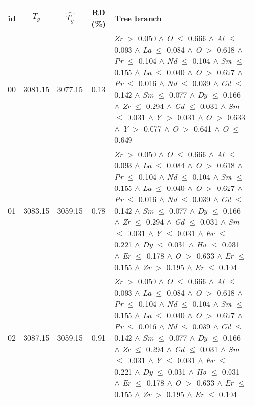 \begin{table}[!htbp]
	\setlength{\tabcolsep}{3pt}
	\begin{tabular}{ccccm{}}
		\toprule
		id & $T_g$ & $\hat{T_g}$ & RD (\%) & Tree branch\\
		\midrule
		00 & 3081.15 & 3077.15 & 0.13 & \textit{Zr} $>$ 0.050 $\wedge$ \textit{O} $\le$ 0.666 $\wedge$ \textit{Al} $\le$ 0.093 $\wedge$ \textit{La} $\le$ 0.084 $\wedge$ \textit{O} $>$ 0.618 $\wedge$ \textit{Pr} $\le$ 0.104 $\wedge$ \textit{Nd} $\le$ 0.104 $\wedge$ \textit{Sm} $\le$ 0.155 $\wedge$ \textit{La} $\le$ 0.040 $\wedge$ \textit{O} $>$ 0.627 $\wedge$ \textit{Pr} $\le$ 0.016 $\wedge$ \textit{Nd} $\le$ 0.039 $\wedge$ \textit{Gd} $\le$ 0.142 $\wedge$ \textit{Sm} $\le$ 0.077 $\wedge$ \textit{Dy} $\le$ 0.166 $\wedge$ \textit{Zr} $\le$ 0.294 $\wedge$ \textit{Gd} $\le$ 0.031 $\wedge$ \textit{Sm} $\le$ 0.031 $\wedge$ \textit{Y} $>$ 0.031 $\wedge$ \textit{O} $>$ 0.633 $\wedge$ \textit{Y} $>$ 0.077 $\wedge$ \textit{O} $>$ 0.641 $\wedge$ \textit{O} $\le$ 0.649\\
		\hline
		01 & 3083.15 & 3059.15 & 0.78 & \textit{Zr} $>$ 0.050 $\wedge$ \textit{O} $\le$ 0.666 $\wedge$ \textit{Al} $\le$ 0.093 $\wedge$ \textit{La} $\le$ 0.084 $\wedge$ \textit{O} $>$ 0.618 $\wedge$ \textit{Pr} $\le$ 0.104 $\wedge$ \textit{Nd} $\le$ 0.104 $\wedge$ \textit{Sm} $\le$ 0.155 $\wedge$ \textit{La} $\le$ 0.040 $\wedge$ \textit{O} $>$ 0.627 $\wedge$ \textit{Pr} $\le$ 0.016 $\wedge$ \textit{Nd} $\le$ 0.039 $\wedge$ \textit{Gd} $\le$ 0.142 $\wedge$ \textit{Sm} $\le$ 0.077 $\wedge$ \textit{Dy} $\le$ 0.166 $\wedge$ \textit{Zr} $\le$ 0.294 $\wedge$ \textit{Gd} $\le$ 0.031 $\wedge$ \textit{Sm} $\le$ 0.031 $\wedge$ \textit{Y} $\le$ 0.031 $\wedge$ \textit{Er} $\le$ 0.221 $\wedge$ \textit{Dy} $\le$ 0.031 $\wedge$ \textit{Ho} $\le$ 0.031 $\wedge$ \textit{Er} $\le$ 0.178 $\wedge$ \textit{O} $>$ 0.633 $\wedge$ \textit{Er} $\le$ 0.155 $\wedge$ \textit{Zr} $>$ 0.195 $\wedge$ \textit{Er} $\le$ 0.104\\
		\hline
		02 & 3087.15 & 3059.15 & 0.91 & \textit{Zr} $>$ 0.050 $\wedge$ \textit{O} $\le$ 0.666 $\wedge$ \textit{Al} $\le$ 0.093 $\wedge$ \textit{La} $\le$ 0.084 $\wedge$ \textit{O} $>$ 0.618 $\wedge$ \textit{Pr} $\le$ 0.104 $\wedge$ \textit{Nd} $\le$ 0.104 $\wedge$ \textit{Sm} $\le$ 0.155 $\wedge$ \textit{La} $\le$ 0.040 $\wedge$ \textit{O} $>$ 0.627 $\wedge$ \textit{Pr} $\le$ 0.016 $\wedge$ \textit{Nd} $\le$ 0.039 $\wedge$ \textit{Gd} $\le$ 0.142 $\wedge$ \textit{Sm} $\le$ 0.077 $\wedge$ \textit{Dy} $\le$ 0.166 $\wedge$ \textit{Zr} $\le$ 0.294 $\wedge$ \textit{Gd} $\le$ 0.031 $\wedge$ \textit{Sm} $\le$ 0.031 $\wedge$ \textit{Y} $\le$ 0.031 $\wedge$ \textit{Er} $\le$ 0.221 $\wedge$ \textit{Dy} $\le$ 0.031 $\wedge$ \textit{Ho} $\le$ 0.031 $\wedge$ \textit{Er} $\le$ 0.178 $\wedge$ \textit{O} $>$ 0.633 $\wedge$ \textit{Er} $\le$ 0.155 $\wedge$ \textit{Zr} $>$ 0.195 $\wedge$ \textit{Er} $\le$ 0.104\\

\end{tabular}
\end{table}
